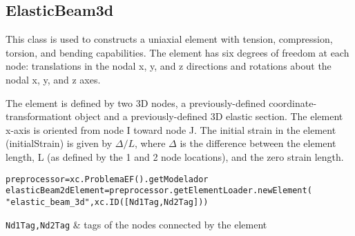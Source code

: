 \begin{methodsTable}
\ElementMeth{} 
\ElementOneDMeth{}
\end{methodsTable}

\subsection{ElasticBeam3d}
This class is used to constructs a uniaxial element with tension, compression, torsion, and bending capabilities. The element has six degrees of freedom at each node: translations in the nodal x, y, and z directions and rotations about the nodal x, y, and z axes. 

The element is defined by two 3D nodes, a previously-defined coordinate-transformationt object and a previously-defined 3D elastic section. The element x-axis is oriented from node I toward node J. The initial strain in the element (initialStrain) is given by $\Delta/L$, where $\Delta$ is the difference between the element length, L (as defined by the 1 and 2 node locations), and the zero strain length. 

\begin{verbatim}
preprocessor=xc.ProblemaEF().getModelador
elasticBeam2dElement=preprocessor.getElementLoader.newElement(
"elastic_beam_3d",xc.ID([Nd1Tag,Nd2Tag]))
\end{verbatim}
\begin{paramFuncTable}
{\tt Nd1Tag,Nd2Tag} & tags of the nodes connected by the element\\
\end{paramFuncTable}


\begin{paramClassTable}
\ElementParam{}
\ElementOneDParam{}
\ProtoBeamThreeDParam{}
\rhoX{} \\
\initialStrain{} \\
\getANTwo{} \\
\getNOne{} \\
\getNTwo{} \\
\getN{} \\
\getAMzOne{} \\
\getAMzTwo{} \\
\getMzOne{} \\
\getMzTwo{} \\
\getMyOne{} \\
\getMyTwo{} \\
\getVy{} \\
\getVyOne{} \\
\getVyTwo{} \\
\getAVyOne{} \\
\getAVyTwo{} \\
\getVz{} \\
\getVzOne{} \\
\getVzTwo{} \\
\getAVzOne{} \\
\getAVzTwo{} \\
\end{paramClassTable}

